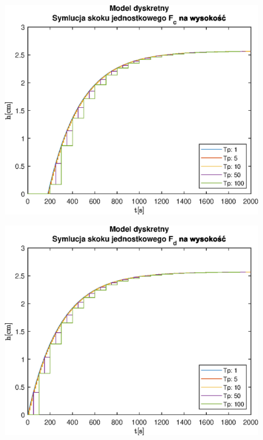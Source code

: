 \begin{figure}[h!]
   \centering
   \includegraphics{img/discrete-step-responses/FcH.eps}
   \caption{}
   \label{}
\end{figure}
            
\begin{figure}[h!]
   \centering
   \includegraphics{img/discrete-step-responses/FdH.eps}
   \caption{}
   \label{}
\end{figure}
            

